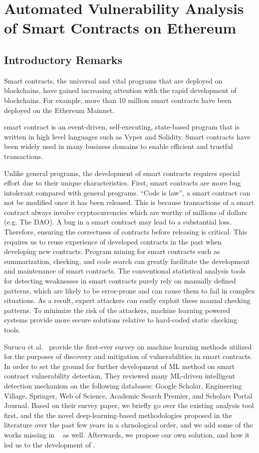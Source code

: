 \chapter{Automated Vulnerability Analysis of Smart Contracts on Ethereum} 
\label{ch:Slither-simil}

\section{Introductory Remarks}
Smart contracts, the universal and vital programs that are deployed on blockchains,
have gained increasing attention with the rapid development of blockchains.
For example, more than 10 million smart contracts have been deployed on the Ethereum Mainnet.

smart contract is an event-driven, self-executing, state-based program that is written in high level languages such as Vyper and Solidity.
Smart contracts have been widely used in many business domains to enable efficient and trustful transactions.

Unlike general programs, the development of smart contracts requires special effort due to their unique characteristics.
First, smart contracts are more bug intolerant compared with general programs.
“Code is law”, a smart contract can not be modified once it has been released. 
This is because transactions of a smart contract always involve cryptocurrencies which are worthy of millions of dollars (e.g. The DAO). 
A bug in a smart contract may lead to a substantial loss.
Therefore, ensuring the correctness of contracts before releasing is critical.
 This requires us to reuse experience of developed contracts in the past when developing new contracts.
Program mining for smart contracts such as summarization, checking, and code search can greatly facilitate the development and maintenance of smart contracts.
The conventional statistical analysis tools for detecting weaknesses in smart contracts purely rely on manually defined patterns, which are likely to be error-prone and can cause them to fail in complex situations.
As a result, expert attackers can easily exploit these manual checking patterns.
To minimize the risk of the attackers, machine learning powered systems provide more secure solutions relative to hard-coded
static checking tools.

Surucu et al.~\cite{surucu2022survey} provide the first-ever survey on machine learning methods utilized for the purposes of discovery and mitigation of vulnerabilities in smart contracts.
In order to set the ground for further development of ML method on smart contract vulnerability detection, They reviewed many ML-driven intelligent detection mechanism on the following databases:
Google Scholar, Engineering Village, Springer, Web of Science, Academic Search Premier, and Scholars Portal Journal.
Based on their survey paper, we briefly go over the existing analysis tool first, and the the novel deep-learning-based methodologies proposed in the literature over the past few years
in a chrnological order, and we add some of the works missing in ~\cite{surucu2022survey} as well.
Afterwards, we propose our own solution, \slithersimil and how it led us to the development of \etherbase.


